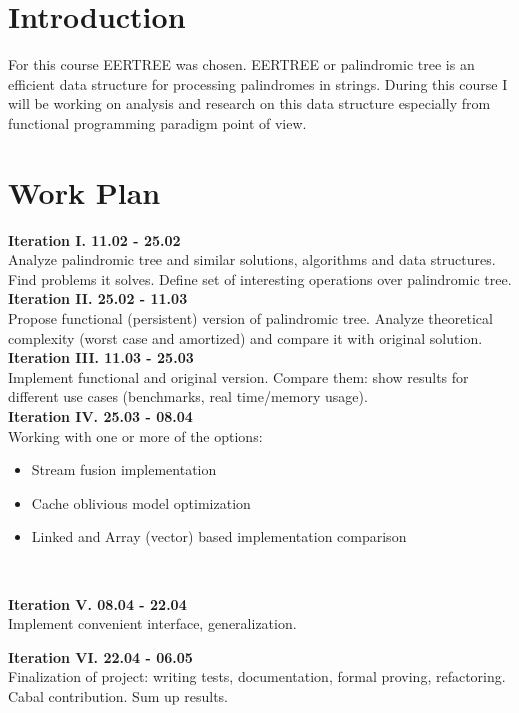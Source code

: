 \section{Introduction}
For this course EERTREE was chosen. EERTREE or palindromic tree is an efficient data structure for processing palindromes in strings. During this course I will be working on analysis and research on this data structure especially from functional programming paradigm point of view.

\section{Work Plan}
\textbf{Iteration I. 11.02 - 25.02}\\
Analyze palindromic tree and similar solutions, algorithms and data structures. Find problems it solves. Define set of interesting operations over palindromic tree.\\

\textbf{Iteration II. 25.02 - 11.03}\\
Propose functional (persistent) version of palindromic tree. Analyze theoretical complexity (worst case and amortized) and compare it with original solution.\\

\textbf{Iteration III. 11.03 - 25.03}\\
Implement functional and original version. Compare them: show results for different use cases (benchmarks, real time/memory usage).\\

\textbf{Iteration IV. 25.03 - 08.04}\\
Working with one or more of the options:
\begin{itemize} 
\item Stream fusion implementation
\item Cache oblivious model optimization
\item Linked and Array (vector) based implementation comparison
\end{itemize} 
\ 

\textbf{Iteration V. 08.04 - 22.04} \\
Implement convenient interface, generalization.
\\ \par
\textbf{Iteration VI. 22.04 - 06.05} \\
Finalization of project: writing tests, documentation, formal proving, refactoring. Cabal contribution. Sum up results.
